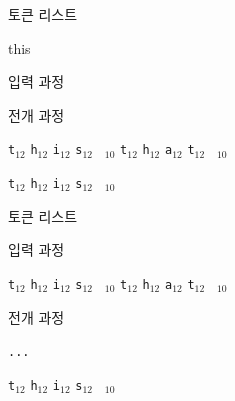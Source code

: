 \documentclass{beamer}
\begin{document}
%
\begin{frame}[fragile]{토큰 리스트}
\begin{verbatim*}
\def\mytoken{\iftrue this \else that \fi}
\mytoken
\end{verbatim*}
    \bigskip
    \alert{입력 과정}
    
    
    \bigskip
    \alert{전개 과정}
    
    \quad
    \verb|t|$_{12}$\quad
    \verb|h|$_{12}$\quad
    \verb|i|$_{12}$\quad
    \verb|s|$_{12}$\quad
    \verb*| |$_{10}$\quad
    \quad
    \verb|t|$_{12}$\quad
    \verb|h|$_{12}$\quad
    \verb|a|$_{12}$\quad
    \verb|t|$_{12}$\quad
    \verb*| |$_{10}$\quad

    \bigskip
    \verb|t|$_{12}$\quad
    \verb|h|$_{12}$\quad
    \verb|i|$_{12}$\quad
    \verb|s|$_{12}$\quad
    \verb*| |$_{10}$\quad
\end{frame}


%
\begin{frame}[fragile]{토큰 리스트}
\begin{verbatim*}
\def\tokentwo{\iftrue this \else that \fi}
\def\tokenone#1{...}
\expandafter\tokenone\tokentwo
\end{verbatim*}
    \bigskip

    \alert{입력 과정}
    
    \quad
    \quad
    \quad
    \verb|t|$_{12}$\quad
    \verb|h|$_{12}$\quad
    \verb|i|$_{12}$\quad
    \verb|s|$_{12}$\quad
    \verb*| |$_{10}$\quad
    \quad
    \verb|t|$_{12}$\quad
    \verb|h|$_{12}$\quad
    \verb|a|$_{12}$\quad
    \verb|t|$_{12}$\quad
    \verb*| |$_{10}$\quad

    \bigskip
    \alert{전개 과정}
    
    \quad
    \quad
    \verb|...|

    \bigskip
    \quad
    \verb|t|$_{12}$\quad
    \verb|h|$_{12}$\quad
    \verb|i|$_{12}$\quad
    \verb|s|$_{12}$\quad
    \verb*| |$_{10}$\quad
\end{frame}
\end{document}
